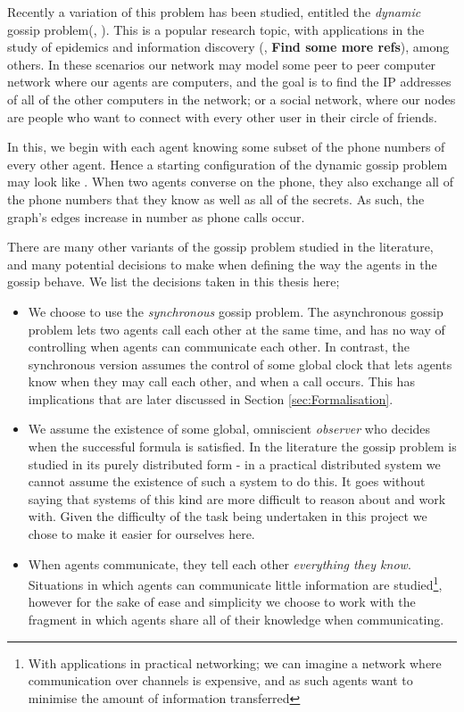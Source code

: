 \documentclass[10pt, a4paper]{report}
\begin{document}
Recently a variation of this problem has been studied, entitled the
\emph{dynamic} gossip problem(\cite{DynamicGossip}, \cite{EpProforDyGo}). This
is a popular research topic, with applications in the study of epidemics and
information discovery (\cite{DiscoverythruGossip}, \textbf{Find some more
  refs}), among others. In these scenarios our network may model some peer to
peer computer network where our agents are computers, and the goal is to find
the IP addresses of all of the other computers in the network; or a social
network, where our nodes are people who want to connect with every other user in
their circle of friends.

In this, we begin with each agent knowing some subset of the phone
numbers of every other agent. Hence a starting configuration of the dynamic
gossip problem may look like . When two agents
converse on the phone, they also exchange all of the phone numbers that they
know as well as all of the secrets. As such, the graph's edges increase in
number as phone calls occur.

There are many other variants of the gossip problem studied in the literature,
and many potential decisions to make when defining the way the agents in the
gossip behave. We list the decisions taken in this thesis here;

\begin{itemize}
  \item We choose to use the \emph{synchronous} gossip problem. The asynchronous
    gossip problem lets two agents call each other at the same time, and has no
    way of controlling when agents can communicate each other. In contrast, the
    synchronous version assumes the control of some global clock that lets
    agents know when they may call each other, and when a call occurs. This has
    implications that are later discussed in Section \ref{sec:Formalisation}.
  \item We assume the existence of some global, omniscient \emph{observer} who
    decides when the successful formula is satisfied. In the literature the
    gossip problem is studied in its purely distributed form - in a practical
    distributed system we cannot assume the existence of such a system to do
    this. It goes without saying that systems of this kind are more difficult to
    reason about and work with. Given the difficulty of the task being
    undertaken in this project we chose to make it easier for ourselves here.
  \item When agents communicate, they tell each other \emph{everything they
      know}. Situations in which agents can communicate little information are
    studied\footnote{With applications in practical networking; we can imagine a
    network where communication over channels is expensive, and as such agents
    want to minimise the amount of information transferred}, however for the
  sake of ease and simplicity we choose to work with the fragment in which
  agents share all of their knowledge when communicating. 
\end{itemize}
\end{document}
